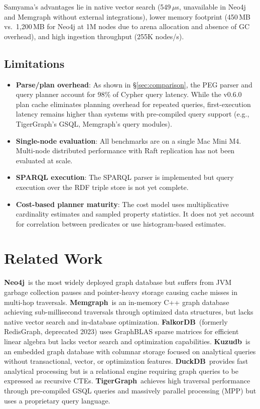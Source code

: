 \documentclass[11pt]{article}
\begin{document}
Samyama's advantages lie in native vector search (549\,$\mu$s, unavailable in Neo4j and Memgraph without external integrations), lower memory footprint (450\,MB vs.\ 1,200\,MB for Neo4j at 1M nodes due to arena allocation and absence of GC overhead), and high ingestion throughput (255K nodes/s).

\subsection{Limitations}
\label{sec:limitations}

\begin{itemize}[leftmargin=*]
  \item \textbf{Parse/plan overhead}: As shown in \S\ref{sec:comparison}, the PEG parser and query planner account for 98\% of Cypher query latency. While the v0.6.0 plan cache eliminates planning overhead for repeated queries, first-execution latency remains higher than systems with pre-compiled query support (e.g., TigerGraph's GSQL, Memgraph's query modules).
  \item \textbf{Single-node evaluation}: All benchmarks are on a single Mac Mini M4. Multi-node distributed performance with Raft replication has not been evaluated at scale.
  \item \textbf{SPARQL execution}: The SPARQL parser is implemented but query execution over the RDF triple store is not yet complete.
  \item \textbf{Cost-based planner maturity}: The cost model uses multiplicative cardinality estimates and sampled property statistics. It does not yet account for correlation between predicates or use histogram-based estimates.
\end{itemize}

\section{Related Work}

\textbf{Neo4j}~is the most widely deployed graph database but suffers from JVM garbage collection pauses and pointer-heavy storage causing cache misses in multi-hop traversals. \textbf{Memgraph}~is an in-memory C++ graph database achieving sub-millisecond traversals through optimized data structures, but lacks native vector search and in-database optimization. \textbf{FalkorDB}~(formerly RedisGraph, deprecated 2023) uses GraphBLAS sparse matrices for efficient linear algebra but lacks vector search and optimization capabilities. \textbf{Kuzudb}~is an embedded graph database with columnar storage focused on analytical queries without transactional, vector, or optimization features. \textbf{DuckDB}~provides fast analytical processing but is a relational engine requiring graph queries to be expressed as recursive CTEs. \textbf{TigerGraph}~achieves high traversal performance through pre-compiled GSQL queries and massively parallel processing (MPP) but uses a proprietary query language.
\end{document}
